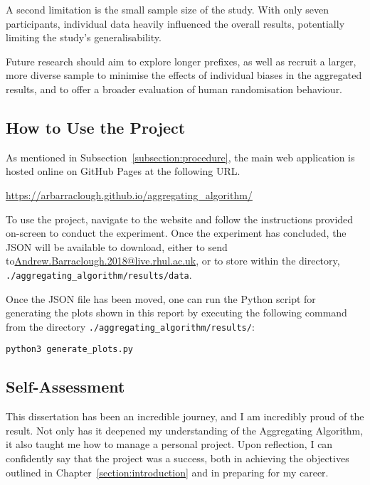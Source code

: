 A second limitation is the small sample size of the study. With only seven participants, individual data heavily influenced the overall results, potentially limiting the study's generalisability.

Future research should aim to explore longer prefixes, as well as recruit a larger, more diverse sample to minimise the effects of individual biases in the aggregated results, and to offer a broader evaluation of human randomisation behaviour.



\subsection{How to Use the Project}\label{subsection:how_to_use_the_project}
As mentioned in Subsection~\ref{subsection:procedure}, the main web application is hosted online on GitHub Pages at the following URL.
\begin{center}
    \url{https://arbarraclough.github.io/aggregating_algorithm/}
\end{center}

To use the project, navigate to the website and follow the instructions provided on-screen to conduct the experiment. Once the experiment has concluded, the JSON will be available to download, either to send to\newline\href{mailto:Andrew.Barraclough.2018@live.rhul.ac.uk}{Andrew.Barraclough.2018@live.rhul.ac.uk}, or to store within the directory, \verb|./aggregating_algorithm/results/data|.

Once the JSON file has been moved, one can run the Python script for generating the plots shown in this report by executing the following command from the directory \verb|./aggregating_algorithm/results/|:

\begin{center}
    \verb|python3 generate_plots.py|
\end{center}

\subsection{Self-Assessment}\label{subsection:self-assessment}
This dissertation has been an incredible journey, and I am incredibly proud of the result. Not only has it deepened my understanding of the Aggregating Algorithm, it also taught me how to manage a personal project. Upon reflection, I can confidently say that the project was a success, both in  achieving the objectives outlined in Chapter~\ref{section:introduction} and in preparing for my career.

